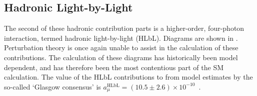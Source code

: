 


\subsection*{Hadronic Light-by-Light}
\label{subsec:HLbL}

The second of these hadronic contribution parts is a higher-order, four-photon interaction, termed hadronic light-by-light (HLbL). Diagrams are shown in . Perturbation theory is once again unable to assist in the calculation of these contributions. The calculation of these diagrams has historically been model dependent, and has therefore been the most contentious part of the SM calculation. The value of the HLbL contributions to \amu from model estimates by the so-called `Glasgow consensus' is $a_{\mu}^{\text{HLbL}} = (10.5 \pm 2.6) \times 10^{-10}$~\cite{Prades:2009tw}.



